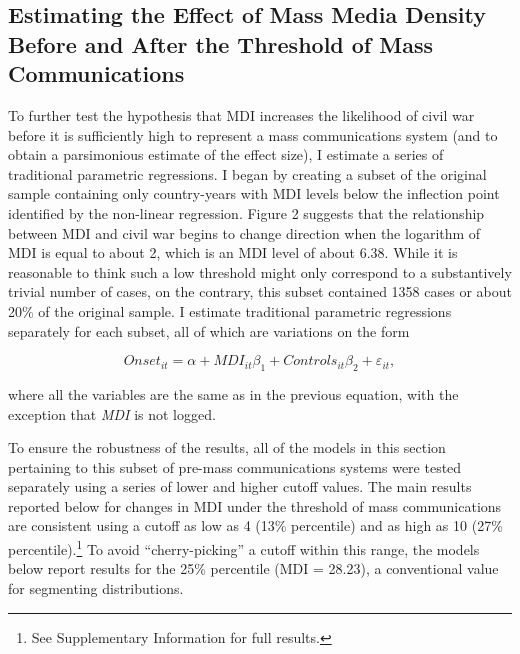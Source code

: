 \documentclass[11pt,article,oneside]{memoir}
\begin{document}
\subsection{Estimating the Effect of Mass Media Density Before and After
the Threshold of Mass
Communications}\label{estimating-the-effect-of-mass-media-density-before-and-after-the-threshold-of-mass-communications}

To further test the hypothesis that MDI increases the likelihood of
civil war before it is sufficiently high to represent a mass
communications system (and to obtain a parsimonious estimate of the
effect size), I estimate a series of traditional parametric regressions.
I began by creating a subset of the original sample containing only
country-years with MDI levels below the inflection point identified by
the non-linear regression. Figure 2 suggests that the relationship
between MDI and civil war begins to change direction when the logarithm
of MDI is equal to about 2, which is an MDI level of about 6.38. While
it is reasonable to think such a low threshold might only correspond to
a substantively trivial number of cases, on the contrary, this subset
contained 1358 cases or about 20\% of the original sample. I estimate
traditional parametric regressions separately for each subset, all of
which are variations on the form

\[ Onset_{it} = \alpha + MDI_{it} \beta_1 + Controls_{it} \beta_2  + \varepsilon_{it}, \]

where all the variables are the same as in the previous equation, with
the exception that \emph{MDI} is not logged.

To ensure the robustness of the results, all of the models in this
section pertaining to this subset of pre-mass communications systems
were tested separately using a series of lower and higher cutoff values.
The main results reported below for changes in MDI under the threshold
of mass communications are consistent using a cutoff as low as 4 (13\%
percentile) and as high as 10 (27\% percentile).\footnote{See
  Supplementary Information for full results.} To avoid
``cherry-picking'' a cutoff within this range, the models below report
results for the 25\% percentile (MDI = 28.23), a conventional value for
segmenting distributions.
\end{document}
